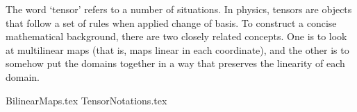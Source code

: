 \label{chap:tensors}

The word `tensor' refers to a number of situations.
In physics, tensors are objects that follow a set of rules
when applied change of basis.
To construct a concise mathematical background,
there are two closely related concepts.
One is to look at multilinear maps
(that is, maps linear in each coordinate),
and the other is to somehow put the domains together
in a way that preserves the linearity of each domain.

{BilinearMaps.tex}
{TensorNotations.tex}